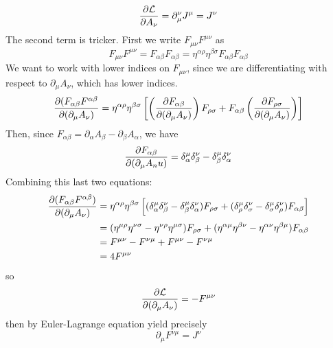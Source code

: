    \begin{equation*}
        \pdv{\mathcal{L}}{A_\nu}=\partial^\nu_\mu J^\mu=J^\nu
    \end{equation*}
    The second term is tricker. First we write $F_{\mu\nu}F^{\mu\nu}$ as
    \begin{equation*}
        F_{\mu\nu}F^{\mu\nu}=F_{\alpha\beta}F_{\alpha\beta}=\eta^{\alpha\rho}\eta^{\beta\sigma}F_{\alpha\beta}F_{\alpha\beta}
    \end{equation*}
    We want to work with lower indices on $F_{\mu\nu}$, since we are differentiating with respect to $\partial_\mu A_\nu$, which has lower indices.
    \begin{equation*}
        \pdv{(F_{\alpha\beta}F^{\alpha\beta}}{(\partial_\mu A_\nu)}=\eta^{\alpha\rho}\eta^{\beta\sigma}\left[\left(\pdv{F_{\alpha\beta}}{(\partial_\mu A_\nu)}\right)F_{\rho\sigma}+F_{\alpha\beta}\left(\pdv{F_{\rho\sigma}}{(\partial_\mu A_\nu)}\right)\right]
    \end{equation*}
    Then, since $F_{\alpha\beta}=\partial_\alpha A_\beta-\partial_\beta A_\alpha$, we have
    \begin{equation*}
        \pdv{F_{\alpha\beta}}{(\partial_\mu A_nu)}=\delta^\mu_\alpha\delta^\nu_\beta-\delta^\mu_\beta\delta^\nu_\alpha
    \end{equation*}
    Combining this last two equations:
    \begin{align*}
        \pdv{(F_{\alpha\beta}F^{\alpha\beta})}{(\partial_\mu A_\nu)}&=\eta^{\alpha\rho}\eta^{\beta\sigma}\left[(\delta^\mu_\alpha\delta^\nu_\beta-\delta^\mu_\beta\delta^\nu_\alpha)F_{\rho\sigma} + (\delta^\mu_\rho\delta^\nu_\sigma-\delta^\mu_\sigma\delta^\nu_\rho)F_{\alpha\beta}\right]\\
        &=(\eta^{\mu\rho}\eta^{\nu\sigma}-\eta^{\nu\rho}\eta^{\mu\sigma})F_{\rho\sigma}+(\eta^{\alpha\mu}\eta^{\beta\nu}-\eta^{\alpha\nu}\eta^{\beta\mu})F_{\alpha\beta}\\
        &=F^{\mu\nu}-F^{\nu\mu}+F^{\mu\nu}-F^{\nu\mu}\\
        &=4F^{\mu\nu}
    \end{align*}
    so
    \begin{equation*}
        \pdv{\mathcal{L}}{(\partial_\mu A_\nu)}=-F^{\mu\nu}
    \end{equation*}
    then by Euler-Lagrange equation yield precisely
    \begin{equation*}
        \partial_\mu F^{\nu\mu}=J^\nu
    \end{equation*}

